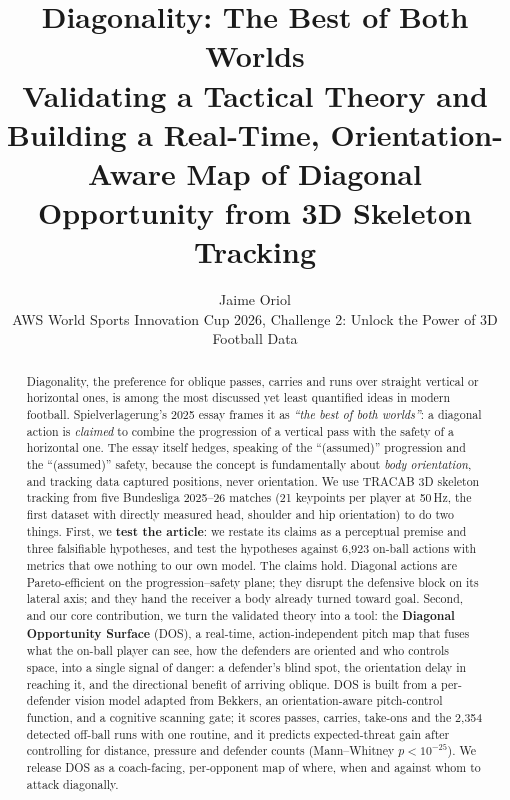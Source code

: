 \documentclass[11pt]{article}
\title{\textbf{Diagonality: The Best of Both Worlds}\\[4pt]
\large Validating a Tactical Theory and Building a Real-Time,
Orientation-Aware Map of Diagonal Opportunity from 3D Skeleton Tracking}
\author{Jaime Oriol\\
\small AWS World Sports Innovation Cup 2026, Challenge 2: Unlock the Power of 3D Football Data}
\date{}
\begin{document}
\maketitle

\begin{abstract}
\noindent
Diagonality, the preference for oblique passes, carries and runs over
straight vertical or horizontal ones, is among the most discussed yet
least quantified ideas in modern football. Spielverlagerung's 2025 essay
frames it as \emph{``the best of both worlds''}: a diagonal action is
\emph{claimed} to combine the progression of a vertical pass with the
safety of a horizontal one. The essay itself hedges, speaking of the
``(assumed)'' progression and the ``(assumed)'' safety, because the
concept is fundamentally about \emph{body orientation}, and tracking data
captured positions, never orientation. We use TRACAB 3D skeleton tracking
from five Bundesliga 2025--26 matches (21 keypoints per player at 50\,Hz,
the first dataset with directly measured head, shoulder and hip
orientation) to do two things. First, we \textbf{test the article}: we
restate its claims as a perceptual premise and three falsifiable
hypotheses, and test the hypotheses against 6{,}923 on-ball actions with
metrics that owe nothing to our own model.
The claims hold. Diagonal actions are Pareto-efficient on the
progression--safety plane; they disrupt the defensive block on its lateral
axis; and they hand the receiver a body already turned toward goal.
Second, and our core contribution, we turn the validated theory into a
tool: the \textbf{Diagonal Opportunity Surface} (DOS), a real-time,
action-independent pitch map that fuses what the on-ball player can see,
how the defenders are oriented and who controls space, into a single
signal of danger: a defender's blind spot, the orientation delay in
reaching it, and the directional benefit of arriving oblique. DOS is built
from a per-defender vision model adapted from Bekkers, an
orientation-aware pitch-control function, and a cognitive scanning gate;
it scores passes, carries, take-ons and the 2{,}354 detected off-ball runs
with one routine, and it predicts expected-threat gain after controlling
for distance, pressure and defender counts (Mann--Whitney $p<10^{-25}$).
We release DOS as a coach-facing, per-opponent map of where, when and
against whom to attack diagonally.
\end{abstract}

\end{document}

